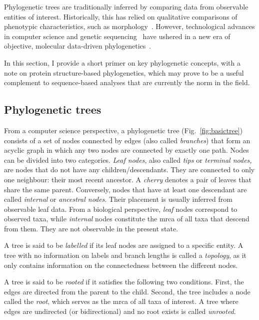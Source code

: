 Phylogenetic trees are traditionally inferred by comparing data from observable entities of interest. Historically, this has relied on qualitative comparisons of phenotypic characteristics, such as morphology~\cite{dietrich1998}. However, technological advances in computer science and genetic sequencing~\cite{sanger1959, sanger1977} have ushered in a new era of objective, molecular data-driven phylogenetics~\cite{michener1957, zuckerkandl1962, zuckerkandl1965, fitch1967}.

In this section, I provide a short primer on key phylogenetic concepts, with a note on protein structure-based phylogenetics, which may prove to be a useful complement to sequence-based analyses that are currently the norm in the field.

\subsection{Phylogenetic trees}

From a computer science perspective, a phylogenetic tree (Fig.~\ref{fig:basictree}) consists of a set of nodes connected by edges (also called \emph{branches}) that form an acyclic graph in which any two nodes are connected by exactly one path. Nodes can be divided into two categories. \emph{Leaf nodes}, also called \emph{tips} or \emph{terminal nodes,} are nodes that do not have any children/descendants. They are connected to only one neighbour: their most recent ancestor. A \emph{cherry} denotes a pair of leaves that share the same parent. Conversely, nodes that have at least one descendant are called \emph{internal} or \emph{ancestral nodes}. Their placement is usually inferred from observable leaf data. From a biological perspective, \emph{leaf} nodes correspond to observed taxa, while \textit{internal} nodes constitute the \gls{mrca} of all taxa that descend from them. They are not observable in the present state.

A tree is said to be \textit{labelled} if its leaf nodes are assigned to a specific entity. A tree with no information on labels and branch lengths is called a \textit{topology}, as it only contains information on the connectedness between the different nodes.

A tree is said to be \emph{rooted} if it satisfies the following two conditions. First, the edges are directed from the parent to the child. Second, the tree includes a node called the \emph{root}, which serves as the \gls{mrca} of all taxa of interest. A tree where edges are undirected (or bidirectional) and no root exists is called \textit{unrooted}.

